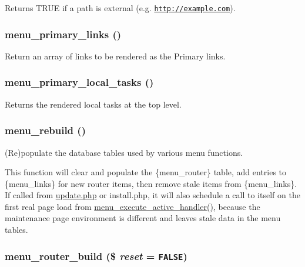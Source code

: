Returns TRUE if a path is external (e.g. \href{http://example.com}{\tt http://example.com}). \hypertarget{group__menu_g472245ad15500b2f7b253f679afd90c7}{
\subsubsection[{menu\_\-primary\_\-links}]{\setlength{\rightskip}{0pt plus 5cm}menu\_\-primary\_\-links ()}}
\label{group__menu_g472245ad15500b2f7b253f679afd90c7}


Return an array of links to be rendered as the Primary links. \hypertarget{group__menu_g83613b83f90d6a12e2f4170ed0ede9b1}{
\subsubsection[{menu\_\-primary\_\-local\_\-tasks}]{\setlength{\rightskip}{0pt plus 5cm}menu\_\-primary\_\-local\_\-tasks ()}}
\label{group__menu_g83613b83f90d6a12e2f4170ed0ede9b1}


Returns the rendered local tasks at the top level. \hypertarget{group__menu_gf36dcb9d5491ef5e7d2cf22c1f5c69f4}{
\subsubsection[{menu\_\-rebuild}]{\setlength{\rightskip}{0pt plus 5cm}menu\_\-rebuild ()}}
\label{group__menu_gf36dcb9d5491ef5e7d2cf22c1f5c69f4}


(Re)populate the database tables used by various menu functions.

This function will clear and populate the \{menu\_\-router\} table, add entries to \{menu\_\-links\} for new router items, then remove stale items from \{menu\_\-links\}. If called from \hyperlink{update_8php}{update.php} or install.php, it will also schedule a call to itself on the first real page load from \hyperlink{group__menu_gc2cef001e8197fecd49924e6e0e251c6}{menu\_\-execute\_\-active\_\-handler()}, because the maintenance page environment is different and leaves stale data in the menu tables. \hypertarget{group__menu_ge6e2fcdb614d7988c160c22d563919ba}{
\subsubsection[{menu\_\-router\_\-build}]{\setlength{\rightskip}{0pt plus 5cm}menu\_\-router\_\-build (\$ {\em reset} = {\tt FALSE})}}
\label{group__menu_ge6e2fcdb614d7988c160c22d563919ba}


